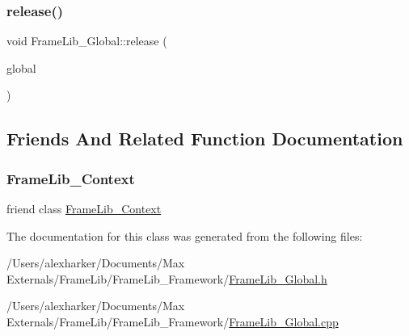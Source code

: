 \mbox{\label{class_frame_lib___global_a079e2b866b66d477ae551e0b0e12ea11}} 
\subsubsection{\texorpdfstring{release()}{release()}}
{\footnotesize\ttfamily void Frame\+Lib\+\_\+\+Global\+::release (\begin{DoxyParamCaption}\item[{\hyperlink{class_frame_lib___global}{Frame\+Lib\+\_\+\+Global} $\ast$$\ast$}]{global }\end{DoxyParamCaption})\hspace{0.3cm}{\ttfamily [static]}}



\subsection{Friends And Related Function Documentation}
\mbox{\label{class_frame_lib___global_a6a4d0dd2956393d740d97600370f6ef8}} 
\subsubsection{\texorpdfstring{Frame\+Lib\+\_\+\+Context}{FrameLib\_Context}}
{\footnotesize\ttfamily friend class \hyperlink{class_frame_lib___context}{Frame\+Lib\+\_\+\+Context}\hspace{0.3cm}{\ttfamily [friend]}}



The documentation for this class was generated from the following files\+:\begin{DoxyCompactItemize}
\item 
/\+Users/alexharker/\+Documents/\+Max Externals/\+Frame\+Lib/\+Frame\+Lib\+\_\+\+Framework/\hyperlink{_frame_lib___global_8h}{Frame\+Lib\+\_\+\+Global.\+h}\item 
/\+Users/alexharker/\+Documents/\+Max Externals/\+Frame\+Lib/\+Frame\+Lib\+\_\+\+Framework/\hyperlink{_frame_lib___global_8cpp}{Frame\+Lib\+\_\+\+Global.\+cpp}\end{DoxyCompactItemize}

